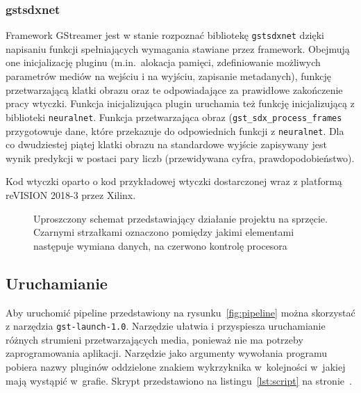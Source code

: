 \documentclass[12pt, oneside, a4paper]{article}
\begin{document}
\subsubsection{gstsdxnet}\label{sec:gstsdxnet}
Framework GStreamer jest w stanie rozpoznać bibliotekę \lstinline{gstsdxnet}
dzięki napisaniu funkcji spełniających wymagania stawiane przez framework.
Obejmują one inicjalizację pluginu (m.in.~alokacja pamięci, zdefiniowanie
możliwych parametrów mediów na wejściu i na wyjściu, zapisanie
metadanych), funkcję
przetwarzającą klatki obrazu oraz te odpowiadające za prawidłowe zakończenie
pracy wtyczki. Funkcja inicjalizująca plugin uruchamia też funkcję
inicjalizującą z biblioteki \lstinline{neuralnet}.
Funkcja przetwarzająca obraz (\lstinline{gst_sdx_process_frames}
przygotowuje dane, które przekazuje do
odpowiednich funkcji z \lstinline{neuralnet}. Dla co dwudziestej piątej
klatki obrazu na standardowe wyjście zapisywany jest wynik predykcji
w postaci pary liczb (przewidywana cyfra, prawdopodobieństwo). 

Kod wtyczki oparto o kod przykładowej wtyczki dostarczonej wraz
z platformą reVISION \mbox{2018-3} przez Xilinx.

\begin{figure}[h]
  \centering
  
  \caption{Uproszczony schemat przedstawiający działanie
  projektu na sprzęcie.
  Czarnymi strzałkami oznaczono pomiędzy jakimi elementami
  następuje wymiana danych, na czerwono kontrolę procesora}\label{fig:physical-scheme}
\end{figure}


\subsection{Uruchamianie}\label{sec:Uruchamianie}
Aby uruchomić pipeline przedstawiony na rysunku~\ref{fig:pipeline}
można skorzystać z narzędzia \lstinline{gst-launch-1.0}.
Narzędzie ułatwia i przyspiesza uruchamianie różnych strumieni
przetwarzających media, ponieważ nie ma potrzeby zaprogramowania
aplikacji. Narzędzie jako argumenty wywołania programu pobiera
nazwy pluginów oddzielone znakiem wykrzyknika
w~kolejności w~jakiej mają wystąpić w~grafie. Skrypt przedstawiono
na listingu~\ref{lst:script} na stronie~\pageref{lst:script}.

\begin{minipage}{\linewidth}

\end{minipage}
\end{document}
